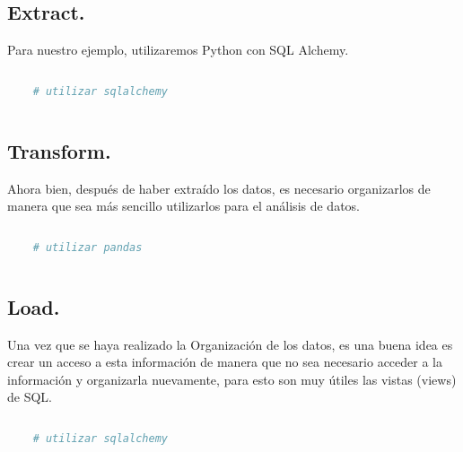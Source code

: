 \documentclass[12pt]{article}
\begin{document}
\subsection{Extract.}

Para nuestro ejemplo, utilizaremos Python con SQL Alchemy.

\vspace{12pt}
\begin{lstlisting}[language=Python]
    
    # utilizar sqlalchemy
    
\end{lstlisting}
\vspace{12pt}

\subsection{Transform.}

Ahora bien, después de haber extraído los datos, es necesario organizarlos de manera que sea más sencillo utilizarlos para el análisis de datos.

\vspace{12pt}
\begin{lstlisting}[language=Python]
    
    # utilizar pandas
    
\end{lstlisting}
\vspace{12pt}

\subsection{Load.}

Una vez que se haya realizado la Organización de los datos, es una buena idea es crear un acceso a esta información de manera que no sea necesario acceder a la información y organizarla nuevamente, para esto son muy útiles las vistas (views) de SQL.

\vspace{12pt}
\begin{lstlisting}[language=Python]
    
    # utilizar sqlalchemy
    
\end{lstlisting}
\vspace{12pt}
\end{document}
